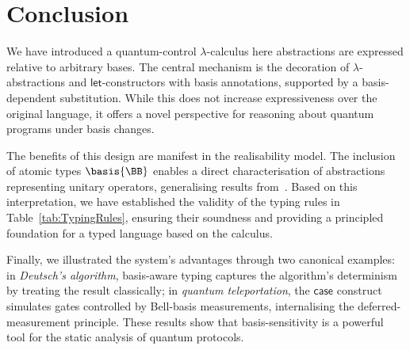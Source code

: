 \section{Conclusion}\label{sec:conclusion}

We have introduced a quantum-control $\lambda$-calculus here 
abstractions are expressed relative to arbitrary bases. The 
central mechanism is the decoration of $\lambda$-abstractions
and $\mathsf{let}$-constructors with basis annotations, 
supported by a basis-dependent substitution. While this does
not increase expressiveness over the original language, it
offers a novel perspective for reasoning about quantum programs
under basis changes. 

The benefits of this design are manifest in the realisability
model. The inclusion of atomic types $\basis{\BB}$ enables a
direct characterisation of abstractions representing unitary
operators, generalising results from~\cite{DiazcaroGuillermoMiquelValironLICS19}.
Based on this interpretation, we have established the validity
of the typing rules in Table~\ref{tab:TypingRules}, ensuring
their soundness and providing a principled foundation for a
typed language based on the calculus.

Finally, we illustrated the system's advantages through two
canonical examples: in \emph{Deutsch's algorithm}, basis-aware
typing captures the algorithm's determinism by treating the
result classically; in \emph{quantum teleportation}, the
$\mathsf{case}$ construct simulates gates controlled by
Bell-basis measurements, internalising the deferred-measurement
principle. These results show that basis-sensitivity is a
powerful tool for the static analysis of quantum protocols.
